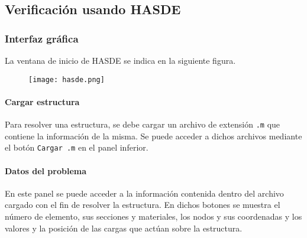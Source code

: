 %
%
%
%


\subsection{Verificación usando HASDE}

\subsubsection{Interfaz gráfica}
La ventana de inicio de HASDE se indica en la siguiente figura.

\begin{figure}[H]
	\begin{center}
		\texttt{[image: hasde.png]}
	\end{center}
\end{figure}
 
\paragraph{Cargar estructura}
Para resolver una estructura, se debe cargar un archivo de extensión \verb|.m| que contiene la información de la misma. Se puede acceder a dichos archivos mediante el botón \verb|Cargar .m| en el panel inferior.

\paragraph{Datos del problema}
En este panel se puede acceder a la información contenida dentro del archivo cargado con el fin de resolver la estructura.
En dichos botones se muestra el número de elemento, sus secciones y materiales, los nodos y sus coordenadas y los valores y la posición de las cargas que actúan sobre la estructura.

